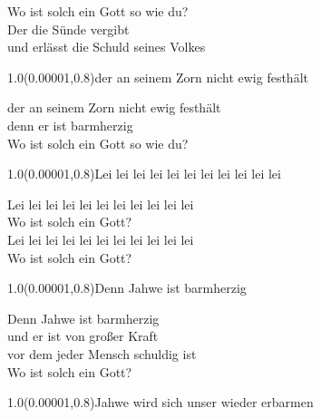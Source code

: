 \documentclass[aspectratio=169]{beamer}
\begin{document}
\color{white}
\begin{frame}
\centering
\color{white}
\huge{Wo ist solch ein Gott so wie du?} \\
\huge{Der die Sünde vergibt} \\
\huge{und erlässt die Schuld seines Volkes} \\

\begin{textblock}{1.0}(0.00001,0.8)\color{gray}\normalsize{der an seinem Zorn nicht ewig festhält}\end{textblock}
\end{frame}

\begin{frame}
\centering
\color{white}
\huge{der an seinem Zorn nicht ewig festhält} \\
\huge{denn er ist barmherzig} \\
\huge{Wo ist solch ein Gott so wie du?} \\

\begin{textblock}{1.0}(0.00001,0.8)\color{gray}\normalsize{Lei lei lei lei lei lei lei lei lei lei lei}\end{textblock}
\end{frame}

\begin{frame}
\centering
\color{white}
\huge{Lei lei lei lei lei lei lei lei lei lei lei} \\
\huge{Wo ist solch ein Gott?} \\
\huge{Lei lei lei lei lei lei lei lei lei lei lei} \\
\huge{Wo ist solch ein Gott?} \\

\begin{textblock}{1.0}(0.00001,0.8)\color{gray}\normalsize{Denn Jahwe ist barmherzig}\end{textblock}
\end{frame}

\begin{frame}
\centering
\color{white}
\huge{Denn Jahwe ist barmherzig} \\
\huge{und er ist von großer Kraft} \\
\huge{vor dem jeder Mensch schuldig ist} \\
\huge{Wo ist solch ein Gott?} \\

\begin{textblock}{1.0}(0.00001,0.8)\color{gray}\normalsize{Jahwe wird sich unser wieder erbarmen}\end{textblock}
\end{frame}
\end{document}
